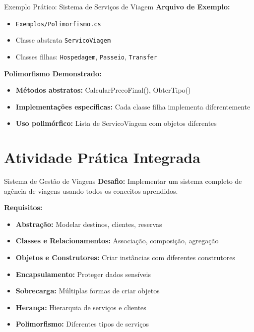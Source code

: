 \documentclass[aspectratio=169]{beamer}
\begin{document}
\begin{frame}{Exemplo Prático: Sistema de Serviços de Viagem}
\textbf{Arquivo de Exemplo:}
\begin{itemize}
    \item \texttt{Exemplos/Polimorfismo.cs}
    \item Classe abstrata \texttt{ServicoViagem}
    \item Classes filhas: \texttt{Hospedagem}, \texttt{Passeio}, \texttt{Transfer}
\end{itemize}

\textbf{Polimorfismo Demonstrado:}
\begin{itemize}
    \item \textbf{Métodos abstratos:} CalcularPrecoFinal(), ObterTipo()
    \item \textbf{Implementações específicas:} Cada classe filha implementa diferentemente
    \item \textbf{Uso polimórfico:} Lista de ServicoViagem com objetos diferentes
\end{itemize}
\end{frame}

\section{Atividade Prática Integrada}

\begin{frame}{Sistema de Gestão de Viagens}
\textbf{Desafio:} Implementar um sistema completo de agência de viagens usando todos os conceitos aprendidos.

\textbf{Requisitos:}
\begin{itemize}
    \item \textbf{Abstração:} Modelar destinos, clientes, reservas
    \item \textbf{Classes e Relacionamentos:} Associação, composição, agregação
    \item \textbf{Objetos e Construtores:} Criar instâncias com diferentes construtores
    \item \textbf{Encapsulamento:} Proteger dados sensíveis
    \item \textbf{Sobrecarga:} Múltiplas formas de criar objetos
    \item \textbf{Herança:} Hierarquia de serviços e clientes
    \item \textbf{Polimorfismo:} Diferentes tipos de serviços
\end{itemize}
\end{frame}
\end{document}
